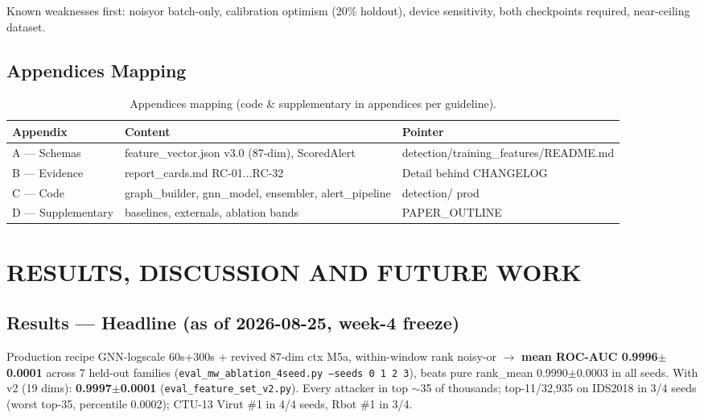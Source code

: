 \documentclass[12pt,a4paper,oneside]{report}
\newcommand{\bluetableheader}{\rowcolor{headerblue}\color{white}\bfseries}
\begin{document}
Known weaknesses first: noisyor batch-only, calibration optimism (20\% holdout), device sensitivity, both checkpoints required, near-ceiling dataset.

\section{Appendices Mapping}

\begin{table}[H]
\centering
\caption{Appendices mapping (code \& supplementary in appendices per guideline).}
\label{tab:4.4}
\begin{tabular}{|L{3cm}|L{5.5cm}|L{6cm}|}
\hline
\bluetableheader Appendix & Content & Pointer \\ \hline
{} A — Schemas & feature\_vector.json v3.0 (87-dim), ScoredAlert & detection/training\_features/README.md \\ \hline
B — Evidence & report\_cards.md RC-01...RC-32 & Detail behind CHANGELOG \\ \hline
{} C — Code & graph\_builder, gnn\_model, ensembler, alert\_pipeline & detection/ prod \\ \hline
D — Supplementary & baselines, externals, ablation bands & PAPER\_OUTLINE \\ \hline
\end{tabular}
\end{table}

\chapter{RESULTS, DISCUSSION AND FUTURE WORK}
\label{ch:results}

\section{Results — Headline (as of 2026-08-25, week-4 freeze)}
Production recipe GNN-logscale 60s+300s + revived 87-dim ctx M5a, within-window rank noisy-or $\rightarrow$ \textbf{mean ROC-AUC 0.9996$\pm$0.0001} across 7 held-out families (\texttt{eval\_mw\_ablation\_4seed.py --seeds 0 1 2 3}), beats pure rank\_mean 0.9990$\pm$0.0003 in all seeds. With v2 (19 dims): \textbf{0.9997$\pm$0.0001} (\texttt{eval\_feature\_set\_v2.py}). Every attacker in top $\sim$35 of thousands; top-11/32,935 on IDS2018 in 3/4 seeds (worst top-35, percentile 0.0002); CTU-13 Virut \#1 in 4/4 seeds, Rbot \#1 in 3/4.
\end{document}
